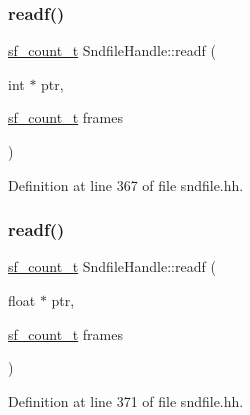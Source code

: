 \subsubsection{\texorpdfstring{readf()}{readf()}\hspace{0.1cm}{\footnotesize\ttfamily [2/4]}}
{\footnotesize\ttfamily \mbox{\hyperlink{sndfile_8h_af2b12fded74bc949f1f1f392a2af4892}{sf\+\_\+count\+\_\+t}} Sndfile\+Handle\+::readf (\begin{DoxyParamCaption}\item[{int $\ast$}]{ptr,  }\item[{\mbox{\hyperlink{sndfile_8h_af2b12fded74bc949f1f1f392a2af4892}{sf\+\_\+count\+\_\+t}}}]{frames }\end{DoxyParamCaption})\hspace{0.3cm}{\ttfamily [inline]}}



Definition at line 367 of file sndfile.\+hh.

\mbox{\label{class_sndfile_handle_af8214c9c6501fb05bc64df83ba85fb6e}} 
\subsubsection{\texorpdfstring{readf()}{readf()}\hspace{0.1cm}{\footnotesize\ttfamily [3/4]}}
{\footnotesize\ttfamily \mbox{\hyperlink{sndfile_8h_af2b12fded74bc949f1f1f392a2af4892}{sf\+\_\+count\+\_\+t}} Sndfile\+Handle\+::readf (\begin{DoxyParamCaption}\item[{float $\ast$}]{ptr,  }\item[{\mbox{\hyperlink{sndfile_8h_af2b12fded74bc949f1f1f392a2af4892}{sf\+\_\+count\+\_\+t}}}]{frames }\end{DoxyParamCaption})\hspace{0.3cm}{\ttfamily [inline]}}



Definition at line 371 of file sndfile.\+hh.

\mbox{\label{class_sndfile_handle_a00da31b8ed6ac1da69330c27adb9297c}} 
